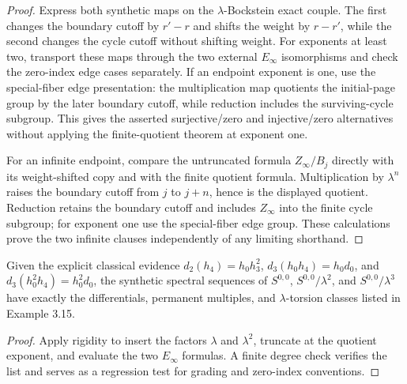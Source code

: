 \begin{proof}
  Express both synthetic maps on the $\lambda$-Bockstein exact couple.  The
  first changes the boundary cutoff by $r'-r$ and shifts the weight by
  $r-r'$, while the second changes the cycle cutoff without shifting weight.
  For exponents at least two, transport these maps through the two external
  $E_\infty$ isomorphisms and check the zero-index edge cases separately.  If
  an endpoint exponent is one, use the special-fiber edge presentation: the
  multiplication map quotients the initial-page group by the later boundary
  cutoff, while reduction includes the surviving-cycle subgroup.  This gives
  the asserted surjective/zero and injective/zero alternatives without
  applying the finite-quotient theorem at exponent one.

  For an infinite endpoint, compare the untruncated formula
  $Z_\infty/B_j$ directly with its weight-shifted copy and with the finite
  quotient formula.  Multiplication by $\lambda^n$ raises the boundary cutoff
  from $j$ to $j+n$, hence is the displayed quotient.  Reduction retains the
  boundary cutoff and includes $Z_\infty$ into the finite cycle subgroup; for
  exponent one use the special-fiber edge group.  These calculations prove
  the two infinite clauses independently of any limiting shorthand.
\end{proof}

\begin{proposition}
  \label{prop:synthetic-14-stem-regression}
  \notready
  Given the explicit classical evidence
  $d_2(h_4)=h_0h_3^2$,
  $d_3(h_0h_4)=h_0d_0$, and
  $d_3(h_0^2h_4)=h_0^2d_0$, the synthetic spectral sequences of
  $S^{0,0}$, $S^{0,0}/\lambda^2$, and $S^{0,0}/\lambda^3$ have exactly the
  differentials, permanent multiples, and $\lambda$-torsion classes listed in
  Example 3.15.
\end{proposition}

\begin{proof}
  Apply rigidity to insert the factors $\lambda$ and $\lambda^2$, truncate at
  the quotient exponent, and evaluate the two $E_\infty$ formulas.  A finite
  degree check verifies the list and serves as a regression test for grading
  and zero-index conventions.
\end{proof}

